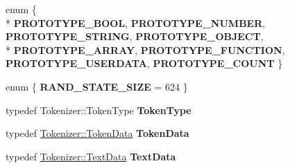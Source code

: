 \begin{DoxyCompactItemize}
\item 
enum \{ \\*
{\bfseries P\+R\+O\+T\+O\+T\+Y\+P\+E\+\_\+\+B\+O\+OL}, 
{\bfseries P\+R\+O\+T\+O\+T\+Y\+P\+E\+\_\+\+N\+U\+M\+B\+ER}, 
{\bfseries P\+R\+O\+T\+O\+T\+Y\+P\+E\+\_\+\+S\+T\+R\+I\+NG}, 
{\bfseries P\+R\+O\+T\+O\+T\+Y\+P\+E\+\_\+\+O\+B\+J\+E\+CT}, 
\\*
{\bfseries P\+R\+O\+T\+O\+T\+Y\+P\+E\+\_\+\+A\+R\+R\+AY}, 
{\bfseries P\+R\+O\+T\+O\+T\+Y\+P\+E\+\_\+\+F\+U\+N\+C\+T\+I\+ON}, 
{\bfseries P\+R\+O\+T\+O\+T\+Y\+P\+E\+\_\+\+U\+S\+E\+R\+D\+A\+TA}, 
{\bfseries P\+R\+O\+T\+O\+T\+Y\+P\+E\+\_\+\+C\+O\+U\+NT}
 \}\hypertarget{class_object_script_1_1_o_s_1_1_core_ac28d58b6588b75b24db6a77d5f9f412a}{}\label{class_object_script_1_1_o_s_1_1_core_ac28d58b6588b75b24db6a77d5f9f412a}

\item 
enum \{ {\bfseries R\+A\+N\+D\+\_\+\+S\+T\+A\+T\+E\+\_\+\+S\+I\+ZE} = 624
 \}\hypertarget{class_object_script_1_1_o_s_1_1_core_a504d66999f626def807b3a653a5d1449}{}\label{class_object_script_1_1_o_s_1_1_core_a504d66999f626def807b3a653a5d1449}

\item 
typedef Tokenizer\+::\+Token\+Type {\bfseries Token\+Type}\hypertarget{class_object_script_1_1_o_s_1_1_core_aa312685e5bd610d9d00a77c1d55af219}{}\label{class_object_script_1_1_o_s_1_1_core_aa312685e5bd610d9d00a77c1d55af219}

\item 
typedef \hyperlink{class_object_script_1_1_o_s_1_1_core_1_1_tokenizer_1_1_token_data}{Tokenizer\+::\+Token\+Data} {\bfseries Token\+Data}\hypertarget{class_object_script_1_1_o_s_1_1_core_ab2f9f78a33486b52b9f7f4253e304c47}{}\label{class_object_script_1_1_o_s_1_1_core_ab2f9f78a33486b52b9f7f4253e304c47}

\item 
typedef \hyperlink{class_object_script_1_1_o_s_1_1_core_1_1_tokenizer_1_1_text_data}{Tokenizer\+::\+Text\+Data} {\bfseries Text\+Data}\hypertarget{class_object_script_1_1_o_s_1_1_core_ad4442b1fe8b6aaeaddcf3f07c1d9f486}{}\label{class_object_script_1_1_o_s_1_1_core_ad4442b1fe8b6aaeaddcf3f07c1d9f486}

\end{DoxyCompactItemize}
